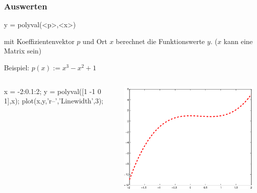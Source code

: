 \documentclass[hyperref={xetex}]{beamer}
\begin{document}
\begin{frame}[fragile]\frametitle{Auswerten}
\begin{matlabin}
y = polyval(<p>,<x>)
\end{matlabin}
mit Koeffizientenvektor $p$ und Ort $x$ berechnet die Funktionswerte $y$.
($x$ kann eine Matrix sein)

\medskip
\alert{Beispiel:} $p(x):= x^3 - x^2 +1$\\
\begin{columns}[c]
\begin{matlabin}
x = -2:0.1:2; 
y = polyval([1 -1 0 1],x); 
plot(x,y,'r--','Linewidth',3);
\end{matlabin}
\includegraphics[width=\textwidth]{figures/polynom1}
\end{columns}
\end{frame}
%
%
\end{document}

